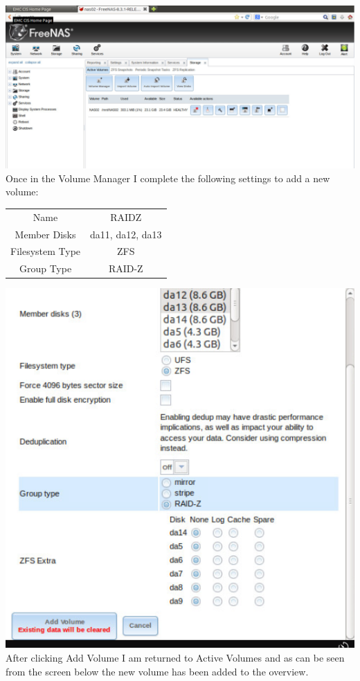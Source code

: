 \includegraphics[width=\textwidth]{3.png}
\newpage
Once in the Volume Manager I complete the following settings to add a new volume:
\begin{center}
\begin{tabular}{ |c|c| } 
 \hline
 Name & RAIDZ \\ 
 Member Disks & da11, da12, da13\\ 
 Filesystem Type & ZFS \\ 
 Group Type & RAID-Z \\
 \hline
\end{tabular}
\end{center}
\includegraphics[width=\textwidth]{4.png}
\newpage
After clicking Add Volume I am returned to Active Volumes and as can be seen from the screen below the new volume has been added to the overview.
